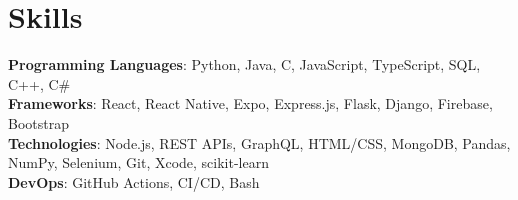 \section{Skills}
    \begin{itemize}[leftmargin=0.15in, label={}]
	\small{\item{
		\textbf{Programming Languages}{: Python, Java, C, JavaScript, TypeScript, SQL, C++, C\#} \\
		\textbf{Frameworks}{: React, React Native, Expo, Express.js, Flask, Django, Firebase, Bootstrap} \\
		\textbf{Technologies}{: Node.js, REST APIs, GraphQL,  HTML/CSS, MongoDB, Pandas, NumPy, Selenium, Git, Xcode, scikit-learn} \\
		\textbf{DevOps}{: GitHub Actions, CI/CD, Bash} \\
	}}
    \end{itemize}
